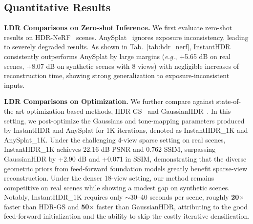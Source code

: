 \documentclass[runningheads]{llncs}
\begin{document}
\subsection{Quantitative Results}

\noindent\textbf{LDR Comparisons on Zero-shot Inference.}
We first evaluate zero-shot results on HDR-NeRF~\cite{huang2022hdr} scenes.
AnySplat~\cite{jiang2025anysplat} ignores exposure inconsistency, leading to severely degraded results.
As shown in Tab.~\ref{tab:hdr_nerf}, InstantHDR consistently outperforms AnySplat by large margins (\textit{e.g.}, +5.65 dB on real scenes, +8.07 dB on synthetic scenes with 8 views) with negligible increases of reconstruction time, showing strong generalization to exposure-inconsistent inputs.

\noindent\textbf{LDR Comparisons on Optimization.}
We further compare against state-of-the-art optimization-based methods, HDR-GS~\cite{cai2024hdr} and GaussianHDR~\cite{liu2025gausshdr}.
In this setting, we post-optimize the Gaussians and tone-mapping parameters produced by InstantHDR and AnySplat for 1K iterations, denoted as InstantHDR\_1K and AnySplat\_1K. 
Under the challenging 4-view sparse setting on real scenes, InstantHDR\_1K achieves 22.16 dB PSNR and 0.762 SSIM, surpassing GaussianHDR by +2.90 dB and +0.071 in SSIM, demonstrating that the diverse geometric priors from feed-forward foundation models greatly benefit sparse-view reconstruction.
Under the denser 18-view setting, our method remains competitive on real scenes while showing a modest gap on synthetic scenes.
Notably, InstantHDR\_1K requires only $\sim$30--40 seconds per scene, roughly \textbf{20$\times$} faster than HDR-GS and \textbf{50$\times$} faster than GaussianHDR, attributing to the good feed-forward initialization and the ability to skip the costly iterative densification.
\end{document}
